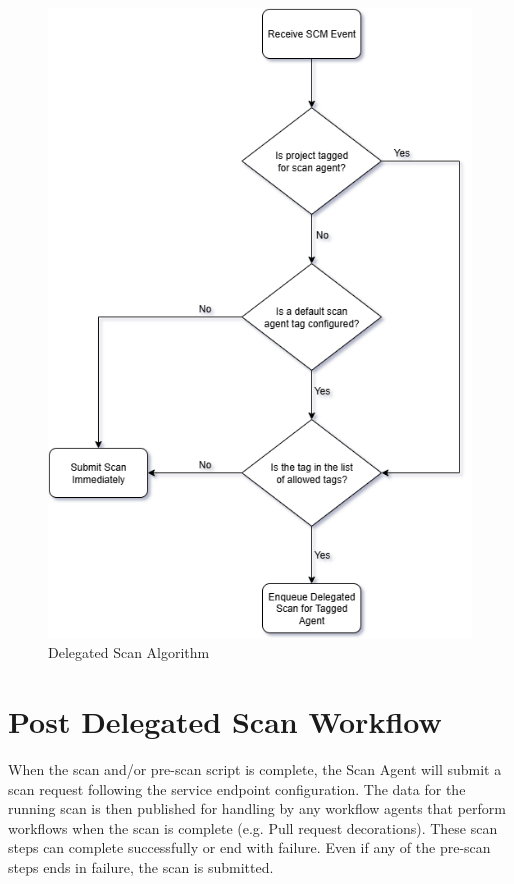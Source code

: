\begin{figure}[ht]
  \includegraphics[scale=.8]{graphics/cxoneflow-diagrams-Delegated Scan Algorithm.png}
  \centering
  \caption{Delegated Scan Algorithm}
  \label{fig:delegated-scan-flowchart}
\end{figure}


\section{Post Delegated Scan Workflow}

When the \scaresolver scan and/or pre-scan script is complete, the Scan Agent will submit
a scan request following the service endpoint configuration.  The data for the running scan
is then published for handling by any workflow agents that perform workflows when the
scan is complete (e.g. Pull request decorations).  These scan steps can
complete successfully or end with failure.  Even if any of the pre-scan steps ends in 
failure, the scan is submitted.

